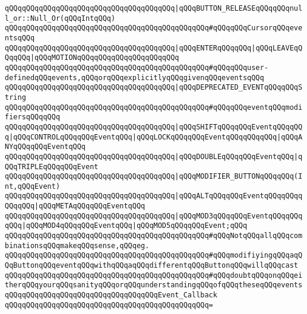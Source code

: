\verb|qQQqqQQqqQQqqQQqqQQqqQQqqQQqqQQqqQQqqQQq|\verb#|qQQqBUTTON_RELEASEqQQqqQQqnull_or::Null_Or(qQQqIntqQQq)#\newline
\verb|qQQqqQQqqQQqqQQqqQQqqQQqqQQqqQQqqQQqqQQqqQQqqQQq#qQQqqQQqCursorqQQqeventsqQQq|\newline
\verb|qQQqqQQqqQQqqQQqqQQqqQQqqQQqqQQqqQQqqQQq|\verb#|qQQqENTERqQQqqQQq|qQQqLEAVEqQQqqQQq|qQQqMOTIONqQQqqQQqqQQqqQQqqQQqqQQq#\newline
\verb|qQQqqQQqqQQqqQQqqQQqqQQqqQQqqQQqqQQqqQQqqQQqqQQq#qQQqqQQquser-definedqQQqevents,qQQqorqQQqexplicitlyqQQqgivenqQQqeventsqQQq|\newline
\verb|qQQqqQQqqQQqqQQqqQQqqQQqqQQqqQQqqQQqqQQq|\verb#|qQQqDEPRECATED_EVENTqQQqqQQqString#\newline
\verb|qQQqqQQqqQQqqQQqqQQqqQQqqQQqqQQqqQQqqQQqqQQqqQQq#qQQqqQQqeventqQQqmodifiersqQQqqQQq|\newline
\verb|qQQqqQQqqQQqqQQqqQQqqQQqqQQqqQQqqQQqqQQq|\verb#|qQQqSHIFTqQQqqQQqEventqQQqqQQq|qQQqCONTROLqQQqqQQqEventqQQq|qQQqLOCKqQQqqQQqEventqQQqqQQqqQQq|qQQqANYqQQqqQQqEventqQQq#\newline
\verb|qQQqqQQqqQQqqQQqqQQqqQQqqQQqqQQqqQQqqQQq|\verb#|qQQqDOUBLEqQQqqQQqEventqQQq|qQQqTRIPLEqQQqqQQqEvent#\newline
\verb|qQQqqQQqqQQqqQQqqQQqqQQqqQQqqQQqqQQqqQQq|\verb#|qQQqMODIFIER_BUTTONqQQqqQQq(Int,qQQqEvent)#\newline
\verb|qQQqqQQqqQQqqQQqqQQqqQQqqQQqqQQqqQQqqQQq|\verb#|qQQqALTqQQqqQQqEventqQQqqQQqqQQqqQQq|qQQqMETAqQQqqQQqEventqQQq#\newline
\verb|qQQqqQQqqQQqqQQqqQQqqQQqqQQqqQQqqQQqqQQq|\verb#|qQQqMOD3qQQqqQQqEventqQQqqQQqqQQq|qQQqMOD4qQQqqQQqEventqQQq|qQQqMOD5qQQqqQQqEvent;qQQq#\newline
\verb|qQQqqQQqqQQqqQQqqQQqqQQqqQQqqQQqqQQqqQQqqQQqqQQq#qQQqNotqQQqallqQQqcombinationsqQQqmakeqQQqsense,qQQqeg.|\newline
\verb|qQQqqQQqqQQqqQQqqQQqqQQqqQQqqQQqqQQqqQQqqQQqqQQq#qQQqmodifiyingqQQqaqQQqButtonqQQqeventqQQqwithqQQqaqQQqdifferentqQQqButtonqQQqwillqQQqcast|\newline
\verb|qQQqqQQqqQQqqQQqqQQqqQQqqQQqqQQqqQQqqQQqqQQqqQQq#qQQqdoubtqQQqonqQQqeitherqQQqyourqQQqsanityqQQqorqQQqunderstandingqQQqofqQQqtheseqQQqevents|\newline
\newline
\newline
\verb|qQQqqQQqqQQqqQQqqQQqqQQqqQQqqQQqqQQqEvent_Callback|\newline
\verb|qQQqqQQqqQQqqQQqqQQqqQQqqQQqqQQqqQQqqQQqqQQqqQQq=|\newline
